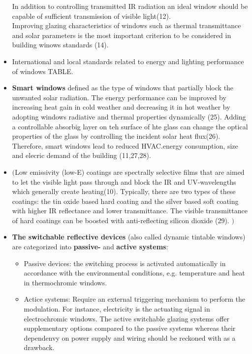 \begin{itemize}
      In addition to controlling transmitted IR radiation an ideal window should be capable 
      of sufficient transmission of visible light(12). \\
      Improving glazing characteristics of windows such as 
      thermal transmittance and solar parameters is the most 
      important criterion to be considered in building winows standards (14).
\item International and local standards related to energy and lighting performance of windows TABLE.
\item \textbf{Smart windows} defined as the type of windows that partially block the unwanted solar radiation.
   The energy performance can be improved by increasing heat gain in cold weather and 
   decreasing it in hot weather by adopting
   windows radiative and thermal properties dynamically (25). Adding a 
   controllable absorbig layer on teh surface of hte glass
   can change the optical properties of the glass by controlling the 
   incident solar heat flux(26). Therefore, smart windows
   lead to reduced HVAC.energy consumption, size and elecric demand of the building (11,27,28).\\
\item $\big($Low emissivity (low-E) coatings are spectrally selective films that are aimed to let the 
   visible light pass through and block the IR and UV-wavelengths which generally create heating(10).
   Typically, there are two types of these coatings: the tin oxide based hard coating and the 
   silver based soft coating with higher IR reflectance and lower transmittance. The visible transmittance
   of hard coatings can be boosted with anti-reflecting silicon dioxide (29). $\big)$
\item \textbf{The switchable reflective devices} (also called dynamic tintable windows) are categorized into
   \textbf{passive-} and \textbf{active systems}:
   \begin{itemize}
         \item Passive devices: the switching process is activated automatically in accordance 
            with the environmental conditions, e.g. temperature and heat in thermochromic windows.
         \item Actice systems: Require an external triggering mechanism to perform the modulation. For 
            instance, electricity is the actuating signal in electrochromic windows. The active
            switchable glazing systems offer supplementary options compared to the passive systems 
            whereas their dependenvy on power supply and wiring should be reckoned with as a drawback.

\end{itemize}
\end{itemize}
